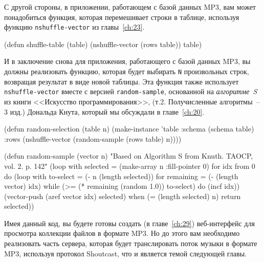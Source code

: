 С другой стороны, в приложении, работающем с базой данных MP3, вам может понадобиться
функция, которая перемешивает строки в таблице, используя функцию \lstinline{nshuffle-vector}
из главы~\ref{ch:23}.

\begin{myverb}
(defun shuffle-table (table)
  (nshuffle-vector (rows table))
  table)
\end{myverb}

И в заключение снова для приложения, работающего с базой данных MP3, вы должны реализовать
функцию, которая будет выбирать \lstinline{N} произвольных строк, возвращая результат в виде
новой таблицы.  Эта функция также использует \lstinline{nshuffle-vector} вместе с версией
\lstinline{random-sample}, основанной на \textit{алгоритме~S} из книги <<Искусство
программирования>>, (т.2.  Получисленные алгоритмы~-- 3 изд.) Дональда Кнута, который мы
обсуждали в главе~\ref{ch:20}.

\begin{myverb}
(defun random-selection (table n)
  (make-instance
   'table
   :schema (schema table)
   :rows (nshuffle-vector (random-sample (rows table) n))))

(defun random-sample (vector n)
  "Based on Algorithm S from Knuth. TAOCP, vol. 2. p. 142"
  (loop with selected = (make-array n :fill-pointer 0)
     for idx from 0
     do
       (loop
          with to-select = (- n (length selected))
          for remaining = (- (length vector) idx)
          while (>= (* remaining (random 1.0)) to-select)
          do (incf idx))
       (vector-push (aref vector idx) selected)
     when (= (length selected) n) return selected))
\end{myverb}

Имея данный код, вы будете готовы создать (в главе~\ref{ch:29}) веб-интерфейс для
просмотра коллекции файлов в формате MP3.  Но до этого вам необходимо реализовать часть
сервера, которая будет транслировать поток музыки в формате MP3, используя протокол
Shoutcast, что и является темой следующей главы.

